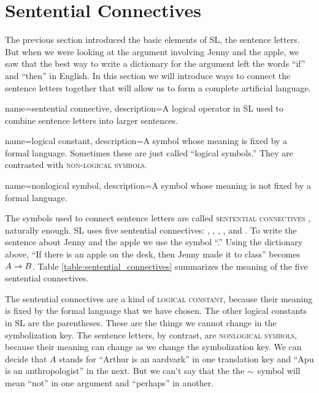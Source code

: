\section{Sentential Connectives}


The previous section introduced the basic elements of SL, the sentence letters. But when we were looking at the argument involving Jenny and the apple, we saw that the best way to write a dictionary for the argument left the words ``if'' and ``then'' in English. In this section we will introduce ways to connect the sentence letters together that will allow us to form a complete artificial language.

{
name=sentential connective,
description={A logical operator in SL used to combine sentence letters into larger sentences.}
}

{
name=logical constant,
description={A symbol whose meaning is fixed by a formal language. Sometimes these are just called ``logical symbols.'' They are contrasted with \textsc{non-logical symbols}.}
}

{
name=nonlogical symbol,
description={A symbol whose meaning is not fixed by a formal language.}
}

The symbols used to connect sentence letters are called \textsc{\glspl{sentential connective}} \label{def:sentential_connective}, naturally enough. SL uses five sentential connectives: \eand, \eor, \enot, \eif, and \eiff. To write the sentence about Jenny and the apple we use the symbol ``\eif.'' Using the dictionary above, ``If there is an apple on the desk, then Jenny made it to class'' becomes $A \rightarrow B$. Table \ref{table:sentential_connectives} summarizes the meaning of the five sentential connectives.

The sentential connectives are a kind of \textsc{\gls{logical constant}},\label{def:logical_constant} because their meaning is fixed by the formal language that we have chosen. The other logical constants in SL are the parentheses. These are the things we cannot change in the symbolization key. The sentence letters, by contrast, are \textsc{\glspl{nonlogical symbol}}, \label{def:nonlogical_symbol} because their meaning can change as we change the symbolization key. We can decide that $A$ stands for ``Arthur is an aardvark'' in one translation key and ``Apu is an anthropologist'' in the next. But we can't say that the  the $\mathord{\sim}$ symbol will mean ``not'' in one argument and ``perhaps'' in another.

